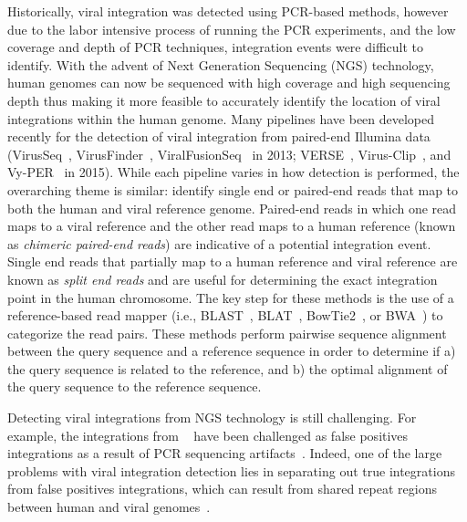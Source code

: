 \documentclass[10pt]{article}
\begin{document}
Historically, viral integration was detected using PCR-based methods, however due to the labor intensive process of running the PCR experiments, and the low coverage and depth of PCR techniques, integration events were difficult to identify.  With the advent of Next Generation Sequencing (NGS) technology, human genomes can now be sequenced with high coverage and high sequencing depth thus making it more feasible to accurately identify the location of viral integrations within the human genome.  Many pipelines have been developed recently for the detection of viral integration from paired-end Illumina data (VirusSeq~\cite{Chen2013}, VirusFinder~\cite{Wang2013}, ViralFusionSeq~\cite{Li2013} in 2013; VERSE~\cite{Wang2015}, Virus-Clip~\cite{Ho2015}, and Vy-PER~\cite{Forster2015} in 2015).  While each pipeline varies in how detection is performed, the overarching theme is similar: identify single end or paired-end reads that map to both the human and viral reference genome.  Paired-end reads in which one read maps to a viral reference and the other read maps to a human reference (known as \emph{chimeric paired-end reads}) are indicative of a potential integration event.  Single end reads that partially map to a human reference and viral reference are known as \emph{split end reads} and are useful for determining the exact integration point in the human chromosome.  The key step for these methods is the use of a reference-based read mapper (i.e., BLAST~\cite{Altschul1990}, BLAT~\cite{Kent2002}, BowTie2~\cite{Langmead2012}, or BWA~\cite{Li2009}) to categorize the read pairs.  These methods perform pairwise sequence alignment between the query sequence and a reference sequence in order to determine if a) the query sequence is related to the reference, and b) the optimal alignment of the query sequence to the reference sequence.

Detecting viral integrations from NGS technology is still challenging.  For example, the integrations from ~\cite{Hu2015} have been challenged as false positives integrations as a result of PCR sequencing artifacts~\cite{Dyer2015}.  Indeed, one of the large problems with viral integration detection lies in separating out true integrations from false positives integrations, which can result from shared repeat regions between human and viral genomes~\cite{Forster2015}.  
\end{document}
